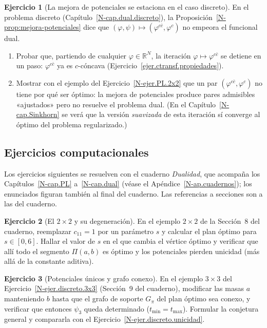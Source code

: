 \documentclass[11pt,a4paper]{amsart}
\newcounter{chapter}
\newcommand{\R}{{\mathbb R}}
\theoremstyle{remark}
\theoremstyle{definition}
\newtheorem{ejercicio}{Ejercicio}[chapter]
\numberwithin{subsection}{section}
\numberwithin{equation}{section}
\begin{document}
\begin{ejercicio}[La mejora de potenciales se estaciona en el caso discreto]\label{ejer.mejora.discreta}
En el problema discreto (Capítulo~\ref{N-cap.dual.discreto}), la
Proposición~\ref{N-prop:mejora-potenciales} dice que $(\varphi,\psi)\mapsto
(\varphi^{c\bar c},\varphi^c)$ no empeora el funcional dual.
\begin{enumerate}[label=(\alph*)]
\item Probar que, partiendo de cualquier $\varphi\in\R^N$, la iteración
$\varphi\mapsto\varphi^{c\bar c}$ se detiene en un paso: $\varphi^{c\bar c}$
ya es $c$-cóncava (Ejercicio~\ref{ejer.ctransf.propiedades}).
\item Mostrar con el ejemplo del Ejercicio~\ref{N-ejer.PL.2x2} que un par
$(\varphi^{c\bar c},\varphi^c)$ no tiene por qué ser óptimo: la mejora de
potenciales produce pares admisibles «ajustados» pero no resuelve el
problema dual. (En el Capítulo~\ref{N-cap.Sinkhorn} se verá que la versión
\emph{suavizada} de esta iteración sí converge al óptimo del problema
regularizado.)
\end{enumerate}
\end{ejercicio}

\subsection*{Ejercicios computacionales}

Los ejercicios siguientes se resuelven con el cuaderno \emph{Dualidad}, que
acompaña los Capítulos~\ref{N-cap.PL} a~\ref{N-cap.dual} (véase el
Apéndice~\ref{N-ap.cuadernos}); los enunciados figuran también al final del
cuaderno. Las referencias a secciones son a las del cuaderno.

\begin{ejercicio}[El $2\times2$ y su degeneración]\label{ejc.dual.2x2}
En el ejemplo $2\times2$ de la Sección~8 del cuaderno, reemplazar
$c_{11}=1$ por un parámetro $s$ y calcular el plan óptimo para $s\in[0,6]$.
Hallar el valor de $s$ en el que cambia el vértice óptimo y verificar que allí
todo el segmento $\Pi(a,b)$ es óptimo y los potenciales pierden unicidad (más
allá de la constante aditiva).
\end{ejercicio}

\begin{ejercicio}[Potenciales únicos y grafo conexo]\label{ejc.dual.conexo}
En el ejemplo $3\times3$ del Ejercicio~\ref{N-ejer.discreto.3x3} (Sección~9
del cuaderno), modificar las masas $a$ manteniendo $b$ hasta que el grafo de
soporte $G_\pi$ del plan óptimo sea conexo, y verificar que entonces $\psi_3$
queda determinado ($t_{\min}=t_{\max}$). Formular la conjetura general y
compararla con el Ejercicio~\ref{N-ejer.discreto.unicidad}.
\end{ejercicio}
\end{document}
